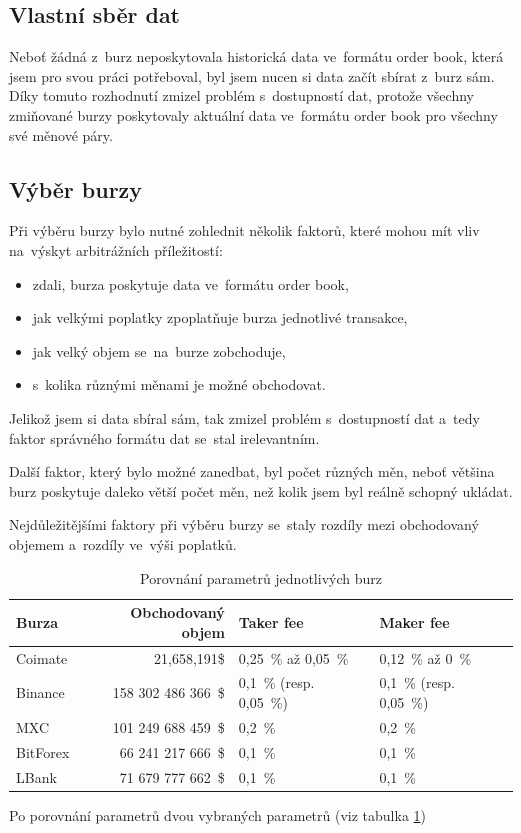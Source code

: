 \documentclass[thesis=B,czech]{FITthesis}[2019/03/21]
\begin{document}
\subsection{Vlastní sběr dat}
Neboť žádná z~burz neposkytovala historická data ve~formátu order book, která jsem pro svou práci potřeboval, byl jsem nucen si data začít sbírat z~burz sám. Díky tomuto rozhodnutí zmizel problém s~dostupností dat, protože všechny zmiňované burzy poskytovaly aktuální data ve~formátu order book pro všechny své měnové páry.

\subsection{Výběr burzy}
Při výběru burzy bylo nutné zohlednit několik faktorů, které mohou mít vliv na~výskyt arbitrážních příležitostí: 
\begin{itemize}
    \item zdali, burza poskytuje data ve~formátu order book,
    \item jak velkými poplatky zpoplatňuje burza jednotlivé transakce,
    \item jak velký objem se~na~burze zobchoduje,
    \item s~kolika různými měnami je možné obchodovat.
\end{itemize}
Jelikož jsem si data sbíral sám, tak zmizel problém s~dostupností dat a~tedy faktor správného formátu dat se~stal irelevantním.

Další faktor, který bylo možné zanedbat, byl počet různých měn, neboť většina burz poskytuje daleko větší počet měn, než kolik jsem byl reálně schopný ukládat. 

Nejdůležitějšími faktory při výběru burzy se~staly rozdíly mezi obchodovaný objemem a~rozdíly ve~výši poplatků.

\begin{table}\centering
     \caption{Porovnání parametrů jednotlivých burz}
     \label{exchanges_comparison}
     \begin{tabular}{||l | r | l | l||} 
     \hline
     Burza & Obchodovaný objem & Taker fee & Maker fee \\ [0.5ex]
     \hline\hline
     Coimate & 21,658,191\$ & 0,25~\% až 0,05~\% & 0,12~\% až 0~\%  \\ 
     \hline
     Binance & 158 302 486 366~\$ & 0,1~\% (resp. 0,05~\%) & 0,1~\% (resp. 0,05~\%)  \\ 
     \hline
     MXC & 101 249 688 459~\$ & 0,2~\% & 0,2~\%  \\ 
     \hline
     BitForex & 66 241 217 666~\$ & 0,1~\% & 0,1~\%  \\ 
     \hline
     LBank & 71 679 777 662~\$ & 0,1~\% & 0,1~\%  \\ 
     \hline
    \end{tabular}
\end{table}
Po porovnání parametrů dvou vybraných parametrů (viz tabulka \ref{exchanges_comparison})
\end{document}
